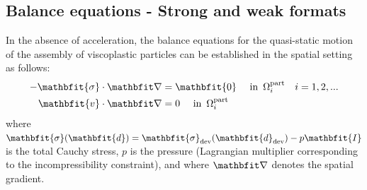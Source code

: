 \documentclass[12pt,a4paper,fleqn]{article}
\renewcommand{\ta}[1]{\mathbfit{#1}}
\renewcommand{\ts}[1]{\mathbfit{#1}}
\newcommand{\pore}{\mathrm{pore}}
\newcommand{\particle}{\mathrm{part}}
\newcommand{\contact}{\mathrm{cont}}
\begin{document}
\subsection{Balance equations - Strong and weak formats}

In the absence of acceleration, the balance equations for the quasi-static motion of the assembly of viscoplastic particles can be established in the spatial setting as follows:
\begin{subequations}\label{eq:strong_form}
\begin{align}
    -\ts{\sigma}\cdot\diff & = \ts{0} \quad \mbox{ in }\,\Omega^\particle_i\quad i = 1,2,...
\label{eq:strong_form_v}
\\
    \ta{v}\cdot\diff & = 0 \quad \mbox{ in }\,\Omega^\particle_i
\label{eq:strong_form_p}
\end{align}
\end{subequations}
where $\ts{\sigma}(\ts{d})=\ts{\sigma}_\dev(\ts{d}_\dev)-p\ts{I}$ is the total Cauchy stress, $p$ is the pressure (Lagrangian multiplier corresponding to the incompressibility constraint), and
where $\diff$ denotes the spatial gradient.

\end{document}
